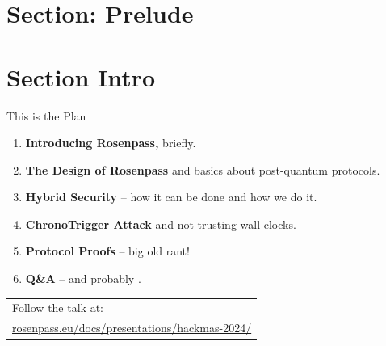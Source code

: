 \section{Section: Prelude}

\section{Section Intro}

\begin{frame}[s]{This is the Plan}
  \small
  \begin{enumerate}
    \item \textbf{Introducing Rosenpass,} briefly.
    \item \textbf{The Design of Rosenpass} and basics about post-quantum protocols.
    \item \textbf{Hybrid Security} – how it can be done and how we do it.
    \item \textbf{ChronoTrigger Attack} and not trusting wall clocks.
    \item \textbf{Protocol Proofs} – big old rant!
    \item \textbf{Q\&A} – and probably .
  \end{enumerate}

	\vfill

  \begin{tabular}[c]{@{\space}l}
  Follow the talk at:\\
  \footnotesize\url{rosenpass.eu/docs/presentations/hackmas-2024/}
  \end{tabular}
  \vfill
\end{frame}



